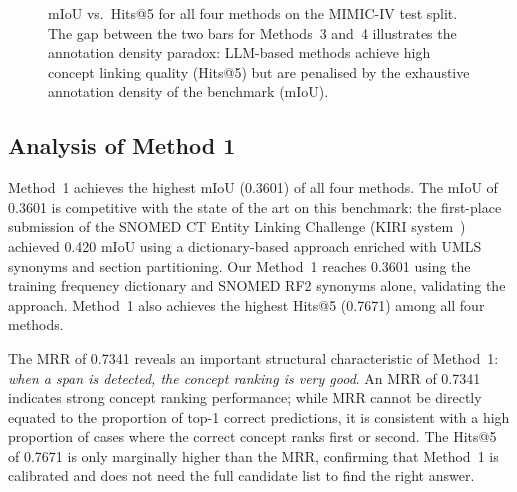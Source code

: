 \begin{figure}[htbp]
\centering
{}
\caption{mIoU vs.\ Hits@5 for all four methods on the MIMIC-IV test split. The gap between the two bars for Methods~3 and~4 illustrates the annotation density paradox: LLM-based methods achieve high concept linking quality (Hits@5) but are penalised by the exhaustive annotation density of the benchmark (mIoU).}
\label{fig:mimic_results}
\end{figure}

\subsection{Analysis of Method 1}

Method~1 achieves the highest mIoU (0.3601) of all four methods. The mIoU of 0.3601 is competitive with the state of the art on this benchmark: the first-place submission of the SNOMED CT Entity Linking Challenge (KIRI system~\cite{Davidson:2025}) achieved 0.420 mIoU using a dictionary-based approach enriched with UMLS synonyms and section partitioning. Our Method~1 reaches 0.3601 using the training frequency dictionary and SNOMED RF2 synonyms alone, validating the approach. Method~1 also achieves the highest Hits@5 (0.7671) among all four methods.

The MRR of 0.7341 reveals an important structural characteristic of Method~1: \textit{when a span is detected, the concept ranking is very good}. An MRR of 0.7341 indicates strong concept ranking performance; while MRR cannot be directly equated to the proportion of top-1 correct predictions, it is consistent with a high proportion of cases where the correct concept ranks first or second. The Hits@5 of 0.7671 is only marginally higher than the MRR, confirming that Method~1 is calibrated and does not need the full candidate list to find the right answer.

